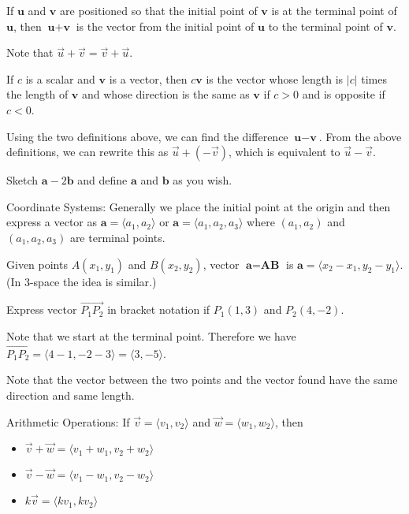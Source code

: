 \documentclass[../calc3.tex]{subfiles}
\begin{document}
\begin{definition}
    If $\textbf{u}$ and $\textbf{v}$ are positioned so that the initial point of $\textbf{v}$ is at the terminal point of $\textbf{u}$, then $\textbf{u}+\textbf{v}$ is the vector from the initial point of $\textbf{u}$ to the terminal point of $\textbf{v}$.
\end{definition}
Note that $\vec{u}+\vec{v}=\vec{v}+\vec{u}$.

\begin{definition}
    If $c$ is a scalar and $\textbf{v}$ is a vector, then $c\textbf{v}$ is the vector whose length is $|c|$ times the length of $\textbf{v}$ and whose direction is the same as $\textbf{v}$ if $c>0$ and is opposite if $c<0$.
\end{definition}

Using the two definitions above, we can find the difference $\textbf{u}-\textbf{v}$. From the above definitions, we can rewrite this as $\vec{u}+(-\vec{v})$, which is equivalent to $\vec{u}-\vec{v}$.

\ex Sketch $\textbf{a}-2\textbf{b}$ and define $\textbf{a}$ and $\textbf{b}$ as you wish.

Coordinate Systems: Generally we place the initial point at the origin and then express a vector as $\textbf{a}=\langle a_1, a_2\rangle$ or $\textbf{a}=\langle a_1,a_2,a_3\rangle$ where $(a_1,a_2)$ 
and $(a_1,a_2,a_3)$ are terminal points.

Given points $A(x_1,y_1)$ and $B(x_2,y_2)$, vector $\textbf{a}=\textbf{AB}$ is $\textbf{a}=\langle x_2-x_1,y_2-y_1\rangle$. (In 3-space the idea is similar.)

\begin{example}
    Express vector $\overrightarrow{P_1P_2}$ in bracket notation if $P_1(1,3)$ and $P_2(4,-2)$.

    Note that we start at the terminal point. Therefore we have $\overrightarrow{P_1P_2}=\langle 4-1,-2-3\rangle=\langle 3,-5\rangle$.

    Note that the vector between the two points and the vector found have the same direction and same length.
\end{example}

Arithmetic Operations: If $\vec{v}=\langle v_1,v_2\rangle$ and $\vec{w}=\langle w_1,w_2\rangle$, then 
\begin{itemize}
    \item $\vec{v}+\vec{w}=\langle v_1+w_1,v_2+w_2\rangle$
    \item $\vec{v}-\vec{w}=\langle v_1-w_1,v_2-w_2\rangle$
    \item $k\vec{v}=\langle kv_1,kv_2\rangle$
\end{itemize}
\end{document}

